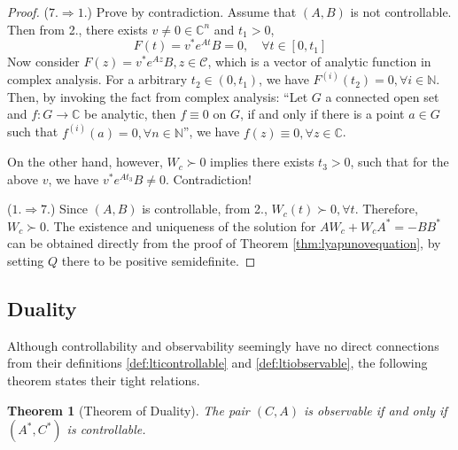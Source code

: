 \documentclass[
]{book}
\newtheorem{theorem}{Theorem}[chapter]
\theoremstyle{definition}
\theoremstyle{definition}
\theoremstyle{definition}
\theoremstyle{definition}
\theoremstyle{remark}
\begin{document}
\begin{proof}
(\(7. \Rightarrow 1.\)) Prove by contradiction. Assume that \((A, B)\) is not controllable. Then from 2., there exists \(v \ne 0 \in \mathbb{C}^n\) and \(t_1 > 0\),
\begin{equation*}
   F(t) = v^* e^{At} B = 0, \quad \forall t \in [0, t_1]
\end{equation*}
Now consider \(F(z) = v^* e^{Az} B, z\in \mathcal{C}\), which is a vector of analytic function in complex analysis. For a arbitrary \(t_2 \in (0, t_1)\), we have \(F^{(i)}(t_2) = 0, \forall i \in \mathbb{N}\). Then, by invoking the fact from complex analysis: ``Let \(G\) a connected open set and \(f: G \rightarrow \mathbb{C}\) be analytic, then \(f \equiv 0\) on \(G\), if and only if there is a point \(a \in G\) such that \(f^{(i)}(a) = 0, \forall n \in \mathbb{N}\)'', we have \(f(z) \equiv 0, \forall z \in \mathbb{C}\).

On the other hand, however, \(W_c \succ 0\) implies there exists \(t_3 > 0\), such that for the above \(v\), we have \(v^* e^{At_3} B \ne 0\). Contradiction!

(\(1. \Rightarrow 7.\)) Since \((A, B)\) is controllable, from 2., \(W_c(t) \succ 0, \forall t\). Therefore, \(W_c \succ 0\). The existence and uniqueness of the solution for \(AW_c + W_cA^* = -BB^*\) can be obtained directly from the proof of Theorem \ref{thm:lyapunovequation}, by setting \(Q\) there to be positive semidefinite.
\end{proof}

\subsection{Duality}\label{duality}

Although controllability and observability seemingly have no direct connections from their definitions \ref{def:lticontrollable} and \ref{def:ltiobservable}, the following theorem \citep{chen1984book-linear} states their tight relations.

\begin{theorem}[Theorem of Duality]
\protect\hypertarget{thm:lti-dual-conobs}{}\label{thm:lti-dual-conobs}The pair \((C,A)\) is observable if and only if \((A^*,C^*)\) is controllable.
\end{theorem}
\end{document}
